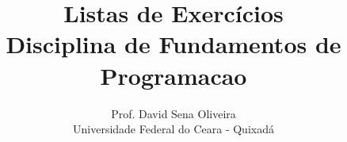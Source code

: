 \title{
Listas de Exercícios\\
Disciplina de Fundamentos de Programacao\\
}
\author{Prof. David Sena Oliveira\\
Universidade Federal do Ceara - Quixadá}
\renewcommand{\today}{Outubro de 2013}

\maketitle
